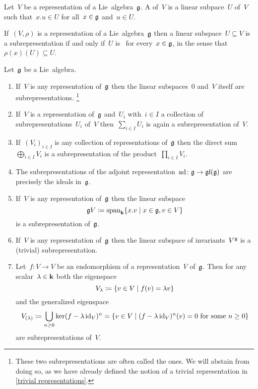 \begin{definition}
  Let~$V$ be a representation of a Lie~algebra~$\mathfrak{g}$.
  A  of~$V$ is a linear subpace~$U$ of~$V$ such that~$x.u \in U$ for all~$x \in \mathfrak{g}$ and~$u \in U$.
\end{definition}


\begin{remark}
  If~$(V, \rho)$ is a representation of a Lie~algebra~$\mathfrak{g}$ then a linear subspace~$U \subseteq V$ is a subrepresentation if and only if~$U$ is~{} for every~$x \in \mathfrak{g}$, in the sense that~$\rho(x)(U) \subseteq U$.
\end{remark}


\begin{examples}
  Let~$\mathfrak{g}$ be a Lie~algebra.
  \begin{enumerate}
    \item
      If~$V$ is any representation of~$\mathfrak{g}$ then the linear subspaces~$0$ and~$V$ itself are subrepresentations.%
    \footnote{These two subrepresentations are often called the  ones.
      We will abstain from doing so, as we have already defined the notion of a trivial representation in \cref{trivial representations}.}
    \item
      If~$V$ is a representation of~$\mathfrak{g}$ and~$U_i$ with~$i \in I$ a collection of subrepresentations~$U_i$ of~$V$ then~$\sum_{i \in I} U_i$ is again a subrepresentation of~$V$.
    \item
      If~$(V_i)_{i \in I}$ is any collection of representations of~$\mathfrak{g}$ then the direct sum~$\bigoplus_{i \in I} V_i$ is a subrepresentation of the product~$\prod_{i \in I} V_i$.
    \item
      The subrepresentations of the adjoint representation~$\operatorname{ad} \colon \mathfrak{g} \to \mathfrak{gl}(\mathfrak{g})$ are precisely the ideals in~$\mathfrak{g}$.
    \item
      If~$V$ is any representation of~$\mathfrak{g}$ then the linear subspace
      \[
        \glie V
        \defined
        \vspan_\kf
        \{
          x.v
          \suchthat
          x \in \glie,
          v \in V
        \}
      \]
      is a subrepresentation of~$\mathfrak{g}$.
    \item
      If~$V$ is any representation of~$\mathfrak{g}$ then the linear subspace of invariants~$V^{\mathfrak{g}}$ is a (trivial) subrepresentation.
    \item
      Let~$f \colon V \to V$ be an endomorphism of a representation~$V$ of~$\mathfrak{g}$.
      Then for any scalar~$\lambda \in \mathbf{k}$ both the eigenspace
      \[
        V_\lambda
        \defined
        \{
          v \in V
        \suchthat
          f(v)
          =
          \lambda v
        \}
      \]
      and the generalized eigenspace
      \[
        V_{(\lambda)}
        \defined
        \bigcup_{n \geq 0} \ker(f - \lambda \id_V)^n
        =
        \{
          v \in V
        \suchthat
        \text{$(f - \lambda \id_V)^n(v) = 0$ for some~$n \geq 0$}
        \}
      \]
      are subrepresentations of~$V$.
  \end{enumerate}
\end{examples}



